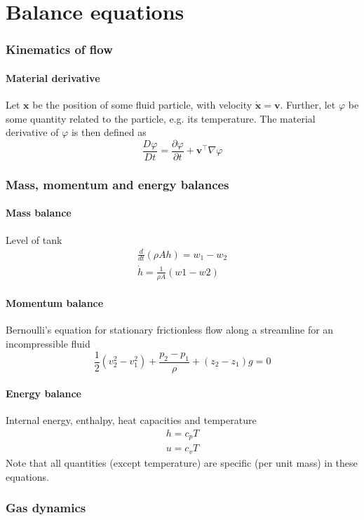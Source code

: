 \part{Balance equations}
\section{Kinematics of flow}
\subsection{Material derivative}
Let $\mathbf{x}$ be the position of some fluid particle, with velocity $\dot{\mathbf{x}} = \mathbf{v}$. Further, let $\varphi$ be some quantity related to the particle, e.g. its temperature. The material derivative of $\varphi$ is then defined as
\begin{equation}
    \frac{D\varphi}{Dt} = \frac{\partial \varphi}{\partial t} + \mathbf{v}^\top \nabla \varphi
\end{equation}

\section{Mass, momentum and energy balances}
\subsection{Mass balance}
Level of tank
\begin{align}
    \frac{d}{dt}(\rho A h) = w_1 - w_2\\
    \dot{h} = \frac{1}{\rho A} (w1 - w2)
\end{align}

\subsection{Momentum balance}
Bernoulli's equation for stationary frictionless flow along a streamline for an incompressible fluid
\begin{equation}
    \frac{1}{2} (v_2^2 - v_1^2) + \frac{p_2 - p_1}{\rho} + (z_2 - z_1)g = 0
\end{equation}

\subsection{Energy balance}
Internal energy, enthalpy, heat capacities and temperature
\begin{align}
    h = c_p T\\
    u = c_v T
\end{align}
Note that all quantities (except temperature) are specific (per unit mass) in these equations. 

\section{Gas dynamics}